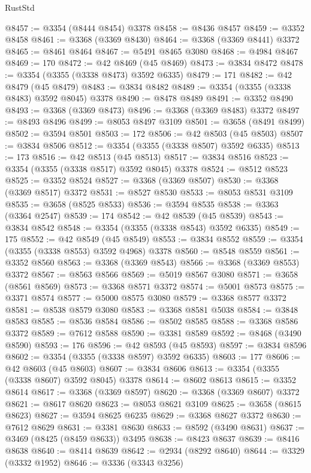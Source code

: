 \begin{lexlean}{RustStd}
\begin{coremodule}
@8457 := @3354 (@8444 @8454) @3378
@8458 := @8436 @8457
@8459 := @3352 @8458
@8461 := @3368 (@3369 @8430)
@8464 := @3368 (@3369 @8441) @3372
@8465 := @8461 @8464
@8467 := @5491 @8465 @3080
@8468 := @4984 @8467
@8469 := 170
@8472 := @42 @8469 (@45 @8469)
@8473 := @3834 @8472
@8478 := @3354 (@3355 (@3338 @8473) @3592 @6335)
@8479 := 171
@8482 := @42 @8479 (@45 @8479)
@8483 := @3834 @8482
@8489 := @3354 (@3355 (@3338 @8483) @3592 @8045) @3378
@8490 := @8478 @8489
@8491 := @3352 @8490
@8493 := @3368 (@3369 @8473)
@8496 := @3368 (@3369 @8483) @3372
@8497 := @8493 @8496
@8499 := @8053 @8497 @3109
@8501 := @3658 (@8491 @8499)
@8502 := @3594 @8501
@8503 := 172
@8506 := @42 @8503 (@45 @8503)
@8507 := @3834 @8506
@8512 := @3354 (@3355 (@3338 @8507) @3592 @6335)
@8513 := 173
@8516 := @42 @8513 (@45 @8513)
@8517 := @3834 @8516
@8523 := @3354 (@3355 (@3338 @8517) @3592 @8045) @3378
@8524 := @8512 @8523
@8525 := @3352 @8524
@8527 := @3368 (@3369 @8507)
@8530 := @3368 (@3369 @8517) @3372
@8531 := @8527 @8530
@8533 := @8053 @8531 @3109
@8535 := @3658 (@8525 @8533)
@8536 := @3594 @8535
@8538 := @3363 (@3364 @2547)
@8539 := 174
@8542 := @42 @8539 (@45 @8539)
@8543 := @3834 @8542
@8548 := @3354 (@3355 (@3338 @8543) @3592 @6335)
@8549 := 175
@8552 := @42 @8549 (@45 @8549)
@8553 := @3834 @8552
@8559 := @3354 (@3355 (@3338 @8553) @3592 @4968) @3378
@8560 := @8548 @8559
@8561 := @3352 @8560
@8563 := @3368 (@3369 @8543)
@8566 := @3368 (@3369 @8553) @3372
@8567 := @8563 @8566
@8569 := @5019 @8567 @3080
@8571 := @3658 (@8561 @8569)
@8573 := @3368 @8571 @3372
@8574 := @5001 @8573
@8575 := @3371 @8574
@8577 := @5000 @8575 @3080
@8579 := @3368 @8577 @3372
@8581 := @8538 @8579 @3080
@8583 := @3368 @8581 @5038
@8584 := @3848 @8583
@8585 := @8536 @8584
@8586 := @8502 @8585
@8588 := @3368 @8586 @3372
@8589 := @7612 @8588
@8590 := @3381 @8589
@8592 := @8468 (@3490 @8590)
@8593 := 176
@8596 := @42 @8593 (@45 @8593)
@8597 := @3834 @8596
@8602 := @3354 (@3355 (@3338 @8597) @3592 @6335)
@8603 := 177
@8606 := @42 @8603 (@45 @8603)
@8607 := @3834 @8606
@8613 := @3354 (@3355 (@3338 @8607) @3592 @8045) @3378
@8614 := @8602 @8613
@8615 := @3352 @8614
@8617 := @3368 (@3369 @8597)
@8620 := @3368 (@3369 @8607) @3372
@8621 := @8617 @8620
@8623 := @8053 @8621 @3109
@8625 := @3658 (@8615 @8623)
@8627 := @3594 @8625 @6235
@8629 := @3368 @8627 @3372
@8630 := @7612 @8629
@8631 := @3381 @8630
@8633 := @8592 (@3490 @8631)
@8637 := @3469 (@8425 (@8459 @8633)) @3495
@8638 := @8423 @8637
@8639 := @8416 @8638
@8640 := @8414 @8639
@8642 := @2934 (@8292 @8640)
@8644 := @3329 (@3332 @1952)
@8646 := @3336 (@3343 @3256)

\end{coremodule}
\end{lexlean}
